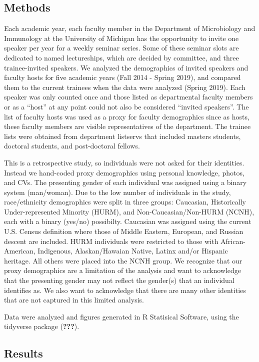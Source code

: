 \documentclass[10pt,]{article}
\begin{document}
\subsection{Methods}\label{methods}

Each academic year, each faculty member in the Department of
Microbiology and Immunology at the University of Michigan has the
opportunity to invite one speaker per year for a weekly seminar series.
Some of these seminar slots are dedicated to named lectureships, which
are decided by committee, and three trainee-invited speakers. We
analyzed the demographics of invited speakers and faculty hosts for five
academic years (Fall 2014 - Spring 2019), and compared them to the
current trainees when the data were analyzed (Spring 2019). Each speaker
was only counted once and those listed as departmental faculty members
or as a ``host'' at any point could not also be considered ``invited
speakers''. The list of faculty hosts was used as a proxy for faculty
demographics since as hosts, these faculty members are visible
representatives of the department. The trainee lists were obtained from
department listservs that included masters students, doctoral students,
and post-doctoral fellows.

This is a retrospective study, so individuals were not asked for their
identities. Instead we hand-coded proxy demographics using personal
knowledge, photos, and CVs. The presenting gender of each individual was
assigned using a binary system (man/woman). Due to the low number of
individuals in the study, race/ethnicity demographics were split in
three groups: Caucasian, Historically Under-represented Minority (HURM),
and Non-Caucasian/Non-HURM (NCNH), each with a binary (yes/no)
possibilty. Caucasian was assigned using the current U.S. Census
definition where those of Middle Eastern, European, and Russian descent
are included. HURM individuals were restricted to those with
African-American, Indigenous, Alaskan/Hawaian Native, Latinx and/or
Hispanic heritage. All others were placed into the NCNH group. We
recognize that our proxy demographics are a limitation of the analysis
and want to acknowledge that the presenting gender may not reflect the
gender(s) that an individual identifies as. We also want to acknowledge
that there are many other identities that are not captured in this
limited analysis.

Data were analyzed and figures generated in R Statisical Software, using
the tidyverse package ({\textbf{???}}).

\subsection{Results}\label{results}
\end{document}
